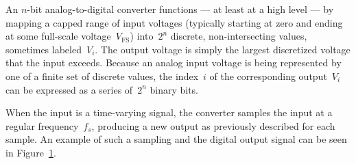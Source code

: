 An $n$-bit analog-to-digital converter functions --- at least at a high level
--- by mapping a capped range of input voltages (typically starting at zero and ending
at some full-scale voltage~$V_\text{FS}$) into~$2^n$ discrete, non-intersecting
values, sometimes labeled~$V_i$.  The output voltage is simply the largest
discretized voltage that the input exceeds.  Because an analog input voltage is
being represented by one of a finite set of discrete values, the index~$i$ of
the corresponding output~$V_i$ can be expressed as a series of~$2^n$ binary
bits.

When the input is a time-varying signal, the converter samples the input
at a regular frequency~$f_s$, producing a new output as previously described
for each sample.  An example of such a sampling and the digital output signal
can be seen in Figure~\ref{fig:theory}.
%
\begin{figure}[H]
	\centering
	\caption{}
	\label{fig:theory}
\end{figure}

\begin{figure}[H]
	\centering
	
\end{figure}

